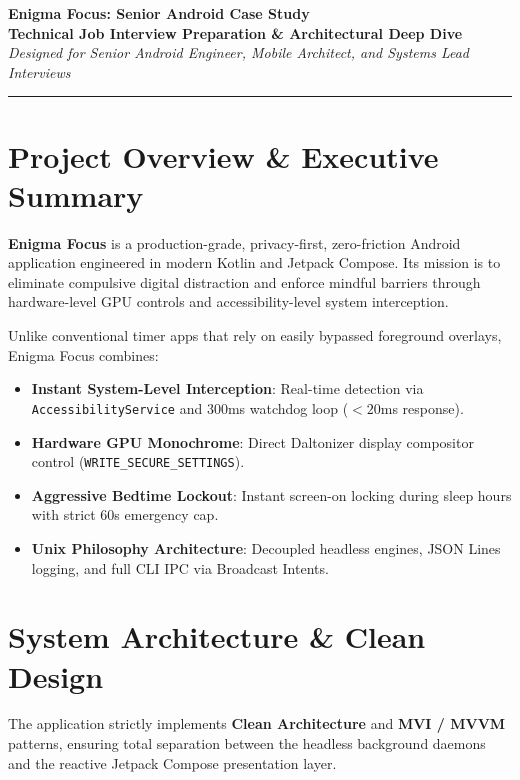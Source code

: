 \documentclass[11pt,a4paper]{article}
\begin{document}
\begin{center}
    {\Huge \textbf{\color{primaryDark}Enigma Focus: Senior Android Case Study}}\\[0.3cm]
    {\Large \textbf{\color{accentGreen}Technical Job Interview Preparation \& Architectural Deep Dive}}\\[0.2cm]
    \textit{Designed for Senior Android Engineer, Mobile Architect, and Systems Lead Interviews}\\[0.4cm]
    \rule{\linewidth}{1.5pt}
\end{center}

\vspace{0.2cm}

\section{Project Overview \& Executive Summary}
\textbf{Enigma Focus} is a production-grade, privacy-first, zero-friction Android application engineered in modern Kotlin and Jetpack Compose. Its mission is to eliminate compulsive digital distraction and enforce mindful barriers through hardware-level GPU controls and accessibility-level system interception.

\begin{tcolorbox}[colback=codeBg,colframe=accentGreen,title=\textbf{Core Engineering Value Proposition}]
Unlike conventional timer apps that rely on easily bypassed foreground overlays, Enigma Focus combines:
\begin{itemize}[noitemsep]
    \item \textbf{Instant System-Level Interception}: Real-time detection via \texttt{AccessibilityService} and 300ms watchdog loop ($<20$ms response).
    \item \textbf{Hardware GPU Monochrome}: Direct Daltonizer display compositor control (\texttt{WRITE\_SECURE\_SETTINGS}).
    \item \textbf{Aggressive Bedtime Lockout}: Instant screen-on locking during sleep hours with strict 60s emergency cap.
    \item \textbf{Unix Philosophy Architecture}: Decoupled headless engines, JSON Lines logging, and full CLI IPC via Broadcast Intents.
\end{itemize}
\end{tcolorbox}

\section{System Architecture \& Clean Design}
The application strictly implements \textbf{Clean Architecture} and \textbf{MVI / MVVM} patterns, ensuring total separation between the headless background daemons and the reactive Jetpack Compose presentation layer.
\end{document}

